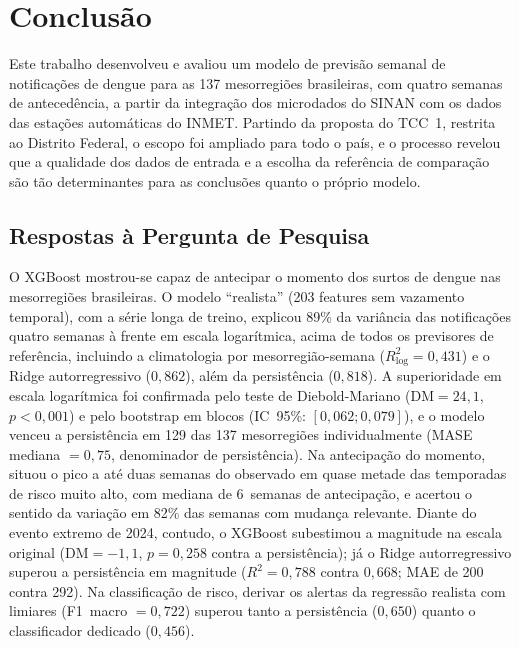 \chapter{Conclusão}
\label{cap:conclusao}

Este trabalho desenvolveu e avaliou um modelo de previsão semanal de notificações de dengue para as 137 mesorregiões brasileiras, com quatro semanas de antecedência, a partir da integração dos microdados do SINAN com os dados das estações automáticas do INMET. Partindo da proposta do TCC~1, restrita ao Distrito Federal, o escopo foi ampliado para todo o país, e o processo revelou que a qualidade dos dados de entrada e a escolha da referência de comparação são tão determinantes para as conclusões quanto o próprio modelo.

\section{Respostas à Pergunta de Pesquisa}

O XGBoost mostrou-se capaz de antecipar o momento dos surtos de dengue nas mesorregiões brasileiras. O modelo ``realista'' (203 features sem vazamento temporal), com a série longa de treino, explicou 89\% da variância das notificações quatro semanas à frente em escala logarítmica, acima de todos os previsores de referência, incluindo a climatologia por mesorregião-semana ($R^2_{\log}=0{,}431$) e o Ridge autorregressivo ($0{,}862$), além da persistência ($0{,}818$). A superioridade em escala logarítmica foi confirmada pelo teste de Diebold-Mariano ($\mathrm{DM}=24{,}1$, $p < 0{,}001$) e pelo bootstrap em blocos (IC~95\%: $[0{,}062; 0{,}079]$), e o modelo venceu a persistência em 129 das 137 mesorregiões individualmente (MASE mediana $=0{,}75$, denominador de persistência). Na antecipação do momento, situou o pico a até duas semanas do observado em quase metade das temporadas de risco muito alto, com mediana de 6~semanas de antecipação, e acertou o sentido da variação em 82\% das semanas com mudança relevante. Diante do evento extremo de 2024, contudo, o XGBoost subestimou a magnitude na escala original ($\mathrm{DM}=-1{,}1$, $p=0{,}258$ contra a persistência); já o Ridge autorregressivo superou a persistência em magnitude ($R^2=0{,}788$ contra $0{,}668$; MAE de 200 contra 292). Na classificação de risco, derivar os alertas da regressão realista com limiares (F1~macro $=0{,}722$) superou tanto a persistência ($0{,}650$) quanto o classificador dedicado ($0{,}456$).

